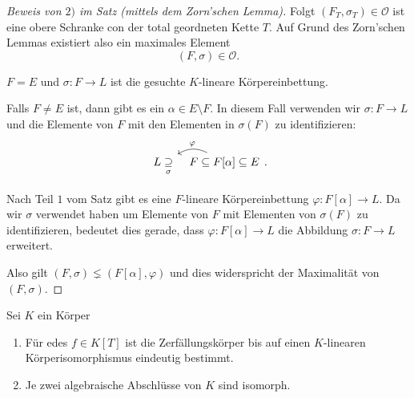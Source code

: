 \begin{proof}[Beweis von $2)$ im Satz (mittels dem Zorn'schen Lemma)]
	Folgt $(F_{T},\sigma_{T}) \in \mathcal{O}$ ist eine obere Schranke con der total geordneten Kette $T$.
	Auf Grund des Zorn'schen Lemmas existiert also ein maximales Element
	\[
		(F,\sigma) \in \mathcal{O}
	.\] 
	\begin{claim}
		$F = E$ und $\sigma : F  \to L$ ist die gesuchte $K$-lineare Körpereinbettung.
	\end{claim}
	Falls $F \neq E$ ist, dann gibt es ein $\alpha \in E \setminus F$. In diesem Fall verwenden wir $\sigma: F \to L$ und die Elemente von
	$F$ mit den Elementen in $\sigma(F)$ zu identifizieren:
	\[
		\begin{tikzcd}[column sep=tiny]
			L \underset{\sigma}{\supseteq} & F \subseteq F[\alpha] \subseteq E \arrow[l, "\varphi"', bend right] %
\end{tikzcd}
	.\] 

	Nach Teil $1$ vom Satz gibt es eine $F$-lineare Körpereinbettung $\varphi: F[\alpha] \to L$.
	Da wir $\sigma$ verwendet haben um Elemente von  $F$ mit Elementen von $\sigma(F)$ zu identifizieren,
	bedeutet dies gerade, dass $\varphi: F[\alpha] \to L$ die Abbildung $\sigma: F \to L$ erweitert.

	Also gilt $(F,\sigma) \lneq (F[\alpha],\varphi)$ und dies widerspricht der Maximalität von $(F,\sigma)$.
\end{proof}

\begin{corollary}
	Sei $K$ ein Körper
	\begin{enumerate}[1)]
		\item Für edes $f \in K[T]$ ist die Zerfällungskörper bis auf einen $K$-linearen Körperisomorphismus eindeutig bestimmt.
		\item Je zwei algebraische Abschlüsse von $K$ sind isomorph.
	\end{enumerate}
\end{corollary}

